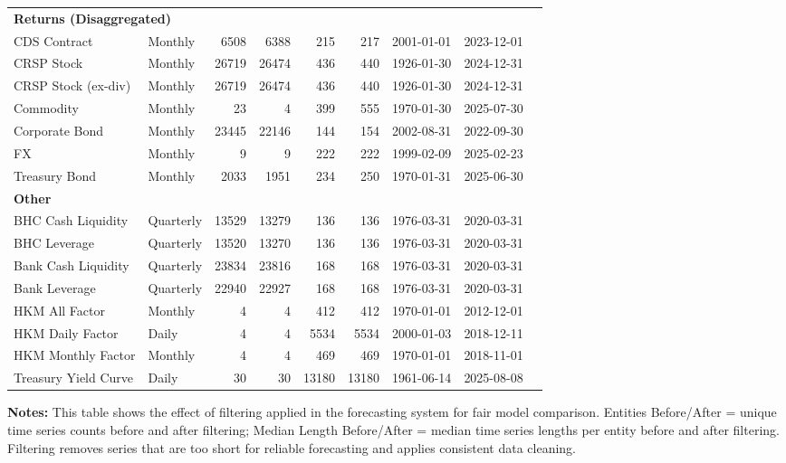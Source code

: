 \begin{table}[htbp]
\begin{tabular}{@{}llrrrrlll@{}}
\midrule
\multicolumn{8}{l}{\textbf{Returns (Disaggregated)}} \\
CDS Contract & Monthly & 6508 & 6388 & 215 & 217 & 2001-01-01 & 2023-12-01 \\
CRSP Stock & Monthly & 26719 & 26474 & 436 & 440 & 1926-01-30 & 2024-12-31 \\
CRSP Stock (ex-div) & Monthly & 26719 & 26474 & 436 & 440 & 1926-01-30 & 2024-12-31 \\
Commodity & Monthly & 23 & 4 & 399 & 555 & 1970-01-30 & 2025-07-30 \\
Corporate Bond & Monthly & 23445 & 22146 & 144 & 154 & 2002-08-31 & 2022-09-30 \\
FX & Monthly & 9 & 9 & 222 & 222 & 1999-02-09 & 2025-02-23 \\
Treasury Bond & Monthly & 2033 & 1951 & 234 & 250 & 1970-01-31 & 2025-06-30 \\
\midrule
\multicolumn{8}{l}{\textbf{Other}} \\
BHC Cash Liquidity & Quarterly & 13529 & 13279 & 136 & 136 & 1976-03-31 & 2020-03-31 \\
BHC Leverage & Quarterly & 13520 & 13270 & 136 & 136 & 1976-03-31 & 2020-03-31 \\
Bank Cash Liquidity & Quarterly & 23834 & 23816 & 168 & 168 & 1976-03-31 & 2020-03-31 \\
Bank Leverage & Quarterly & 22940 & 22927 & 168 & 168 & 1976-03-31 & 2020-03-31 \\
HKM All Factor & Monthly & 4 & 4 & 412 & 412 & 1970-01-01 & 2012-12-01 \\
HKM Daily Factor & Daily & 4 & 4 & 5534 & 5534 & 2000-01-03 & 2018-12-11 \\
HKM Monthly Factor & Monthly & 4 & 4 & 469 & 469 & 1970-01-01 & 2018-11-01 \\
Treasury Yield Curve & Daily & 30 & 30 & 13180 & 13180 & 1961-06-14 & 2025-08-08 \\
\bottomrule
\end{tabular}
\vspace{0.1cm}
\begin{minipage}{\textwidth}
\scriptsize
\textbf{Notes:} This table shows the effect of filtering applied in the forecasting system for fair model comparison. 
Entities Before/After = unique time series counts before and after filtering; 
Median Length Before/After = median time series lengths per entity before and after filtering. 
Filtering removes series that are too short for reliable forecasting and applies consistent data cleaning.
\end{minipage}
\end{table}